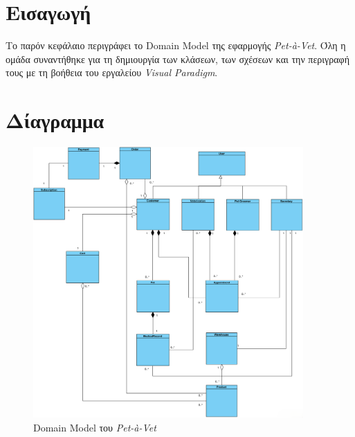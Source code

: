 \documentclass[12pt,a4paper,twoside]{book}
\begin{document}
\section{Εισαγωγή}
Το παρόν κεφάλαιο περιγράφει το Domain Model της εφαρμογής \textit{Pet-à-Vet}. Όλη η ομάδα συναντήθηκε για τη δημιουργία των κλάσεων, των σχέσεων και την περιγραφή τους με τη βοήθεια του εργαλείου \textit{Visual Paradigm}. %

\section{Δίαγραμμα}
\begin{figure}[H]
    \centering
    \includegraphics[width=0.92\textwidth]{Resources/Domain-model-v0.1.png}
    \caption{Domain Model του \textit{Pet-à-Vet}}\label{fig:domain_model}
\end{figure}
\end{document}
